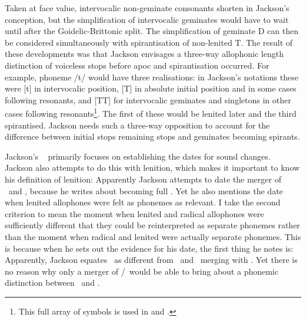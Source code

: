 Taken at face value, intervocalic non-geminate consonants shorten in Jackson's conception, but the simplification of intervocalic geminates would have to wait until after the Goidelic-Brittonic split. The simplification of geminate \gls{D} can then be considered simultaneously with spirantisation of non-lenited \gls{T}. The result of these developments was that Jackson envisages a three-way allophonic length distinction of voiceless stops before \gls{apoc} and spirantisation occurred. For example, \gls{phoneme} /t/ would have three realisations: in Jackson's notations these were [t] in intervocalic position, [T] in absolute initial position and in some cases following  resonants, and [TT] for intervocalic geminates and singletons in other cases following  resonants\footnote{This full array of symbols is used in \textcite{Jac_Gemination60} and \textcite{Jac_Historical67}.}. The first of these would be lenited later and the third spirantised. Jackson needs such a three-way opposition  to account for the difference between initial stops remaining stops and geminates becoming spirants. 


Jackson's ~\autocite*{jackson_language_1953} primarily focuses on establishing the dates for sound changes. Jackson also attempts to do this with lenition, which makes it important to know his definition of lenition:
Apparently Jackson attempts to date the merger of \lT\ and \xD, because he writes about  becoming full . Yet he also mentions the date when lenited allophones were felt as \gls{phoneme}s as  relevant. I take the second criterion to mean the moment when lenited and radical allophones were sufficiently different that they could be reinterpreted as separate \gls{phoneme}s rather than the moment when radical and lenited were actually separate \gls{phoneme}s. This is because when he sets out the evidence for his date, the first thing he notes is:
Apparently, Jackson equates  \lT\ as different from \xT\ and  \lT\ merging with \xD. Yet there is no reason why only a merger of \lT/\xD\ would be able to bring about a phonemic distinction between \xT\ and \lT.

